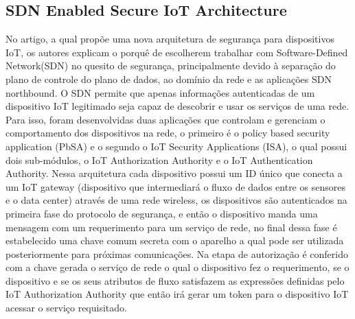 \documentclass[article]{abntex2}
\begin{document}
\subsection{SDN Enabled Secure IoT Architecture}%
No artigo, a qual propõe uma nova arquitetura de segurança para dispositivos IoT, os autores explicam o porquê de escolherem trabalhar com Software-Defined Network(SDN) no quesito de segurança, principalmente devido à separação do plano de controle do plano de dados, ao domínio da rede e as aplicações SDN northbound. O SDN permite que apenas informações autenticadas de um dispositivo IoT legitimado seja capaz de descobrir e usar os serviços de uma rede. Para isso, foram desenvolvidas duas aplicações que controlam e gerenciam o comportamento dos dispositivos na rede, o primeiro é o policy based security application (PbSA) e o segundo o IoT Security Applications (ISA), o qual possui dois sub-módulos, o IoT Authorization Authority e o IoT Authentication Authority. Nessa arquitetura cada dispositivo possui um ID único que conecta a um IoT gateway (dispositivo que intermediará o fluxo de dados entre os sensores e o data center) através de uma rede wireless, os dispositivos são autenticados na primeira fase do protocolo de segurança, e então o dispositivo manda uma mensagem com um requerimento para um serviço de rede, no final dessa fase é estabelecido uma chave comum secreta com o aparelho a qual pode ser utilizada posteriormente para próximas comunicações. Na etapa de autorização é conferido com a chave gerada  o serviço de rede o qual o dispositivo fez o requerimento, se o dispositivo e se os seus atributos de fluxo satisfazem as expressões definidas pelo IoT Authorization Authority que então irá gerar um token para o dispositivo IoT acessar o serviço requisitado.
\end{document}
